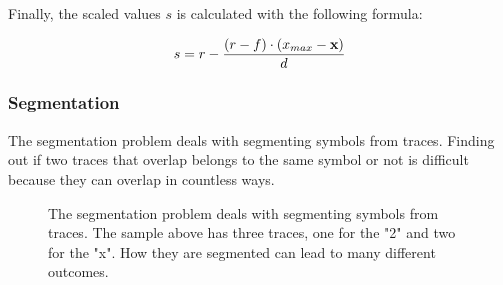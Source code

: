 Finally, the scaled values $s$ is calculated with the following formula:

\begin{equation} \label{eqn:scale_linear_by_column}
\centering
\begin{split}
    s = r - \frac{(r - f) \cdot (x_{max} - \textbf{x})}{d}
\end{split}
\end{equation}

\label{scale_linear_by_column}

\subsubsection{Segmentation} \label{Segmentation}
The segmentation problem deals with segmenting symbols from traces. Finding out if two traces that overlap belongs to the same symbol or not is difficult because they can overlap in countless ways.

\begin{figure}[H]
\centering
{}
\caption{The segmentation problem deals with segmenting symbols from traces. The sample above has three traces, one for the "2"  and two for the "x". How they are segmented can lead to many different outcomes.}
\label{fig:segmentation_1}
\end{figure}

